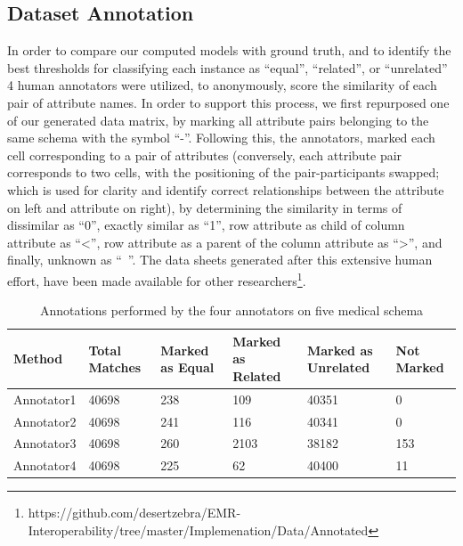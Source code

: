 \documentclass{ieeeaccess}
\begin{document}
\subsection{Dataset Annotation}
In order to compare our computed models with ground truth, and to identify the best thresholds for classifying each instance as ``equal'', ``related'', or ``unrelated'' 4 human annotators were utilized, to anonymously, score the similarity of each pair of attribute names. In order to support this process, we first repurposed one of our generated data matrix, by marking all attribute pairs belonging to the same schema with the symbol ``-''. Following this, the annotators, marked each cell corresponding to a pair of attributes (conversely, each attribute pair corresponds to two cells, with the positioning of the pair-participants swapped; which is used for clarity and identify correct relationships between the attribute on left and attribute on right), by determining the similarity in terms of dissimilar as ``0'', exactly similar as ``1'', row attribute as child of column attribute as ``<'', row attribute as a parent of the column attribute as ``>'', and finally, unknown as ``~''. The data sheets generated after this extensive human effort, have been made available for other researchers\footnote{https://github.com/desertzebra/EMR-Interoperability/tree/master/Implemenation/Data/Annotated}.

\begin{table}
	\centering
	\caption{Annotations performed by the four annotators on five medical schema}
	\label{tab:annotator_marking}
	\begin{tabular}{|l|l|l|l|l|l|}
		\hline
		Method     & Total Matches & Marked as Equal & Marked as Related & Marked as Unrelated & Not Marked \\ \hline
		Annotator1 & 40698         & 238             & 109               & 40351               & 0          \\
		Annotator2 & 40698         & 241             & 116               & 40341               & 0          \\
		Annotator3 & 40698         & 260             & 2103              & 38182               & 153        \\
		Annotator4 & 40698         & 225             & 62                & 40400               & 11         \\ \hline
	\end{tabular}
\end{table}
\end{document}
